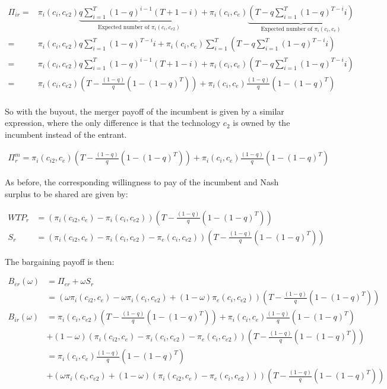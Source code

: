 \documentclass[11pt]{article}
\begin{document}
\begin{align*}
\Pi_{ir} =& \pi_{i}(c_i,c_{e2}) \underbrace{q \sum_{i=1}^{T} (1-q)^{i-1} (T+1-i)}_{\text{Expected number of } \pi_{i}(c_i,c_{e2})}+ \pi_i(c_i,c_e) \underbrace{ (T-q \sum_{i=1}^{T} (1-q)^{T-i} i)}_{\text{Expected number of } \pi_{i}(c_i,c_{e})}
\\
=& \pi_{i}(c_i,c_{e2}) q \sum_{i=1}^{T} (1-q)^{T-i} i + \pi_i(c_i,c_e)  \sum_{i=1}^T (T-q \sum_{i=1}^{T} (1-q)^{T-i} i)
\\ =& \pi_{i}(c_i,c_{e2})q \sum_{i=1}^{T} (1-q)^{i-1} (T+1-i)+ \pi_i(c_i,c_e) (T-q \sum_{i=1}^{T} (1-q)^{T-i} i)
\\ =&\pi_{i}(c_i,c_{e2}) \left( T - \frac{(1-q)}{q} \left( 1-(1-q)^T \right) \right)
+\pi_i(c_i,c_e) \frac{(1-q)}{q} \left( 1-(1-q)^T \right) \\
\end{align*}

So with the buyout, the merger payoff of the incumbent is given by a similar expression, where the only difference is that the technology $c_2$ is owned by the incumbent instead of the entrant. 

\begin{align*}
\Pi^m_r = \pi_{i}(c_{i2},c_{e}) \left( T - \frac{(1-q)}{q} \left( 1-(1-q)^T \right) \right)
+\pi_i(c_i,c_e) \frac{(1-q)}{q} \left( 1-(1-q)^T \right)
\end{align*}

As before, the corresponding willingness to pay of the incumbent and Nash surplus to be shared are given by: 

\begin{align*}
WTP_r &= (\pi_{i}(c_{i2},c_{e})-\pi_{i}(c_{i},c_{e2})) \left( T - \frac{(1-q)}{q} \left( 1-(1-q)^T \right) \right) \\
S_r &= (\pi_{i}(c_{i2},c_{e})-\pi_{i}(c_{i},c_{e2})-\pi_{e}(c_{i},c_{e2})) \left( T - \frac{(1-q)}{q} \left( 1-(1-q)^T \right) \right)
\end{align*}

The bargaining payoff is then:

\begin{align*}
B_{er}(\omega) &= \Pi_{er}+\omega S_r \\
&= \left(\omega\pi_{i}(c_{i2},c_{e})-\omega \pi_{i}(c_{i},c_{e2})+(1-\omega)\pi_{e}(c_{i},c_{e2}) \right) \left( T - \frac{(1-q)}{q} \left( 1-(1-q)^T \right) \right) \\
B_{ir}(\omega) &=\pi_{i}(c_i,c_{e2}) \left( T - \frac{(1-q)}{q} \left( 1-(1-q)^T \right) \right)
+\pi_i(c_i,c_e) \frac{(1-q)}{q} \left( 1-(1-q)^T \right)
\\ &+(1-\omega)(\pi_{i}(c_{i2},c_{e})-\pi_{i}(c_{i},c_{e2})-\pi_{e}(c_{i},c_{e2})) \left( T - \frac{(1-q)}{q} \left( 1-(1-q)^T \right) \right) \\
&=\pi_i(c_i,c_e) \frac{(1-q)}{q} \left( 1-(1-q)^T \right)
\\ &+(\omega \pi_i(c_i,c_{e2})+(1-\omega)(\pi_{i}(c_{i2},c_{e})-\pi_{e}(c_{i},c_{e2}))) \left( T - \frac{(1-q)}{q} \left( 1-(1-q)^T \right) \right)
\end{align*}
\end{document}
